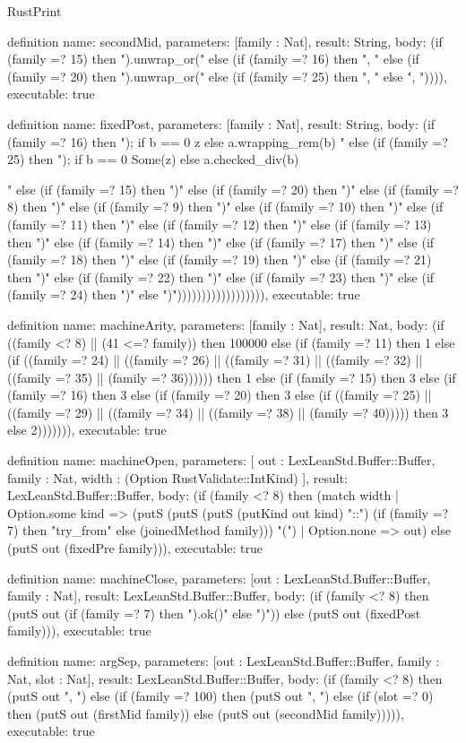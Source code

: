 \begin{lexlean}{RustPrint}
\begin{semanticmodule}
{{definition{
  name: secondMid,
  parameters: [family : Nat],
  result: String,
  body: (if (family =? 15) then ").unwrap_or(" else (if (family =? 16) then ", " else (if (family =? 20) then ").unwrap_or(" else (if (family =? 25) then ", " else ", ")))),
  executable: true
}

definition{
  name: fixedPost,
  parameters: [family : Nat],
  result: String,
  body: (if (family =? 16) then "); if b == 0 { z } else { a.wrapping_rem(b) } }" else (if (family =? 25) then "); if b == 0 { Some(z) } else { a.checked_div(b) } }" else (if (family =? 15) then ")" else (if (family =? 20) then ")" else (if (family =? 8) then ")" else (if (family =? 9) then ")" else (if (family =? 10) then ")" else (if (family =? 11) then ")" else (if (family =? 12) then ")" else (if (family =? 13) then ")" else (if (family =? 14) then ")" else (if (family =? 17) then ")" else (if (family =? 18) then ")" else (if (family =? 19) then ")" else (if (family =? 21) then ")" else (if (family =? 22) then ")" else (if (family =? 23) then ")" else (if (family =? 24) then ")" else ")")))))))))))))))))),
  executable: true
}

definition{
  name: machineArity,
  parameters: [family : Nat],
  result: Nat,
  body: (if ((family <? 8) || (41 <=? family)) then 100000 else (if (family =? 11) then 1 else (if ((family =? 24) || ((family =? 26) || ((family =? 31) || ((family =? 32) || ((family =? 35) || (family =? 36)))))) then 1 else (if (family =? 15) then 3 else (if (family =? 16) then 3 else (if (family =? 20) then 3 else (if ((family =? 25) || ((family =? 29) || ((family =? 34) || ((family =? 38) || (family =? 40))))) then 3 else 2))))))),
  executable: true
}

definition{
  name: machineOpen,
  parameters: [
    out : LexLeanStd.Buffer::Buffer,
    family : Nat,
    width : (Option RustValidate::IntKind)
  ],
  result: LexLeanStd.Buffer::Buffer,
  body: (if (family <? 8) then (match width
    | Option.some kind => (putS (putS (putS (putKind out kind) "::") (if (family =? 7) then "try_from" else (joinedMethod family))) "(")
    | Option.none => out) else (putS out (fixedPre family))),
  executable: true
}

definition{
  name: machineClose,
  parameters: [out : LexLeanStd.Buffer::Buffer, family : Nat],
  result: LexLeanStd.Buffer::Buffer,
  body: (if (family <? 8) then (putS out (if (family =? 7) then ").ok()" else ")")) else (putS out (fixedPost family))),
  executable: true
}

definition{
  name: argSep,
  parameters: [out : LexLeanStd.Buffer::Buffer, family : Nat, slot : Nat],
  result: LexLeanStd.Buffer::Buffer,
  body: (if (family <? 8) then (putS out ", ") else (if (family =? 100) then (putS out ", ") else (if (slot =? 0) then (putS out (firstMid family)) else (putS out (secondMid family))))),
  executable: true
}


\end{semanticmodule}
\end{lexlean}
